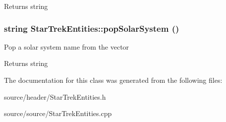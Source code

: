 \begin{DoxyReturn}{Returns}
string 
\end{DoxyReturn}
\hypertarget{classStarTrekEntities_a3c0cc386ad82f31b06067a11fd153d9b}{
\subsubsection[{popSolarSystem}]{\setlength{\rightskip}{0pt plus 5cm}string StarTrekEntities::popSolarSystem ()}}
\label{d0/ddd/classStarTrekEntities_a3c0cc386ad82f31b06067a11fd153d9b}
Pop a solar system name from the vector

\begin{DoxyReturn}{Returns}
string 
\end{DoxyReturn}


The documentation for this class was generated from the following files:\begin{DoxyCompactItemize}
\item 
source/header/StarTrekEntities.h\item 
source/source/StarTrekEntities.cpp\end{DoxyCompactItemize}
